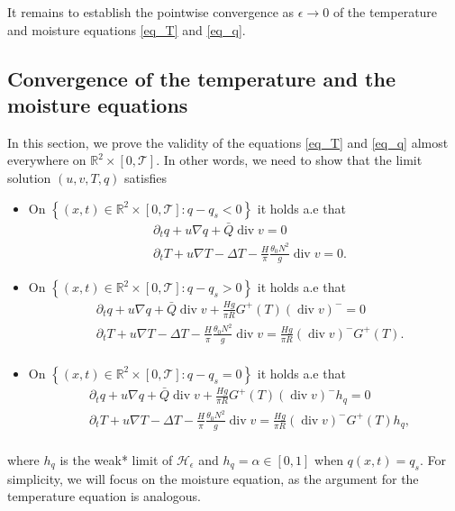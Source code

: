 \documentclass[11pt, a4paper, article,reqno,]{amsart}
\theoremstyle{remark}
\DeclareMathOperator{\dive}{div}
\numberwithin{equation}{section}
\begin{document}
It remains to establish the pointwise convergence as $\epsilon \to 0$ of the temperature and moisture equations \eqref{eq_T} and \eqref{eq_q}.

\subsection*{Convergence of the temperature and the moisture equations}
In this section, we prove the validity of the equations \eqref{eq_T} and \eqref{eq_q} almost everywhere on $\mathbb{R}^2 \times [0, \mathcal{T}]$. 
In other words, we need to show that the limit solution $(u,v,T,q)$ satisfies

\begin{itemize}
    \item[\textbf{I case:}] On $\left\{ (x,t) \in \mathbb{R}^2 \times [0, \mathcal{T}]: q-q_s < 0 \right\}$ it holds a.e that
    \begin{align*}
        & \partial_t q + u \nabla q + \bar{Q}\dive v = 0 \\
        &  \partial_t T + u \nabla T - \Delta T -\frac{H}{\pi}\frac{\theta_0 N^2}{g} \dive v = 0.
    \end{align*}
    \item[\textbf{II case:}]On $\left\{(x,t) \in \mathbb{R}^2 \times [0, \mathcal{T}]: q-q_s > 0 \right\}$ it holds a.e that
    \begin{equation*}
        \begin{aligned}
            & \partial_t q + u \nabla q + \bar{Q}\dive v + \frac{H g}{\pi R}G^+(T)(\dive v)^-= 0 \\
            &  \partial_t T + u \nabla T - \Delta T -\frac{H}{\pi}\frac{\theta_0 N^2}{g} \dive v =   \frac{H g}{\pi R}(\dive v)^- G^+(T). \\
        \end{aligned}
    \end{equation*} 
    \item[\textbf{III case:}] On $\left\{(x,t) \in \mathbb{R}^2 \times [0, \mathcal{T}]: q-q_s = 0 \right\}$ it holds a.e that
    \begin{equation*}
        \begin{aligned}
            & \partial_t q + u \nabla q + \bar{Q}\dive v +\frac{H g}{\pi R}G^+(T)(\dive v)^-h_q= 0 \\
            &  \partial_t T + u \nabla T - \Delta T -\frac{H}{\pi}\frac{\theta_0 N^2}{g} \dive v =   \frac{H g}{\pi R}(\dive v)^- G^+(T) h_q,\\
        \end{aligned}
    \end{equation*}
\end{itemize}
where $h_q$ is the weak* limit of $\mathcal{H}_\epsilon$ and $h_q = \alpha \in [0,1]$ when $q(x,t)=q_s$. For simplicity, we will focus on the moisture equation, as the argument for the temperature equation is analogous.
\end{document}
